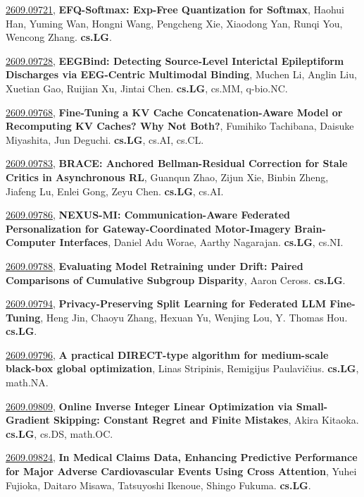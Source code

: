 \documentclass[9pt, a4paper]{article}
\theoremstyle{plain}
\theoremstyle{definition}
\theoremstyle{remark}
\newcommand{\arxivwithtarget}[3]{\hypertarget{#1}{}\href{https://arxiv.org/abs/#1}{#1}, \textbf{\textcolor{arxivblue}{#2}}, #3. }
\begin{document}
\arxivwithtarget{2609.09721}{EFQ-Softmax: Exp-Free Quantization for Softmax}{Haohui Han, Yuming Wan, Hongni Wang, Pengcheng Xie, Xiaodong Yan, Runqi You, Wencong Zhang}\textbf{cs.LG}.



\arxivwithtarget{2609.09728}{EEGBind: Detecting Source-Level Interictal Epileptiform Discharges via EEG-Centric Multimodal Binding}{Muchen Li, Anglin Liu, Xuetian Gao, Ruijian Xu, Jintai Chen}\textbf{cs.LG}, cs.MM, q-bio.NC.



\arxivwithtarget{2609.09768}{Fine-Tuning a KV Cache Concatenation-Aware Model or Recomputing KV Caches? Why Not Both?}{Fumihiko Tachibana, Daisuke Miyashita, Jun Deguchi}\textbf{cs.LG}, cs.AI, cs.CL.



\arxivwithtarget{2609.09783}{BRACE: Anchored Bellman-Residual Correction for Stale Critics in Asynchronous RL}{Guanqun Zhao, Zijun Xie, Binbin Zheng, Jiafeng Lu, Enlei Gong, Zeyu Chen}\textbf{cs.LG}, cs.AI.



\arxivwithtarget{2609.09786}{NEXUS-MI: Communication-Aware Federated Personalization for Gateway-Coordinated Motor-Imagery Brain-Computer Interfaces}{Daniel Adu Worae, Aarthy Nagarajan}\textbf{cs.LG}, cs.NI.



\arxivwithtarget{2609.09788}{Evaluating Model Retraining under Drift: Paired Comparisons of Cumulative Subgroup Disparity}{Aaron Ceross}\textbf{cs.LG}.



\arxivwithtarget{2609.09794}{Privacy-Preserving Split Learning for Federated LLM Fine-Tuning}{Heng Jin, Chaoyu Zhang, Hexuan Yu, Wenjing Lou, Y. Thomas Hou}\textbf{cs.LG}.



\arxivwithtarget{2609.09796}{A practical DIRECT-type algorithm for medium-scale black-box global optimization}{Linas Stripinis, Remigijus Paulavičius}\textbf{cs.LG}, math.NA.



\arxivwithtarget{2609.09809}{Online Inverse Integer Linear Optimization via Small-Gradient Skipping: Constant Regret and Finite Mistakes}{Akira Kitaoka}\textbf{cs.LG}, cs.DS, math.OC.



\arxivwithtarget{2609.09824}{In Medical Claims Data, Enhancing Predictive Performance for Major Adverse Cardiovascular Events Using Cross Attention}{Yuhei Fujioka, Daitaro Misawa, Tatsuyoshi Ikenoue, Shingo Fukuma}\textbf{cs.LG}.
\end{document}

